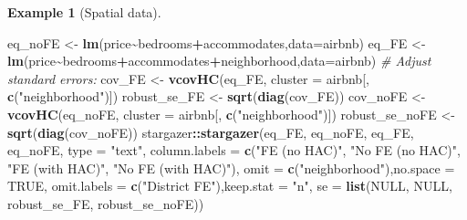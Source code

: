 \documentclass[
  12pt,
]{book}
\newenvironment{Shaded}{\begin{snugshade}}{\end{snugshade}}
\newcommand{\AttributeTok}[1]{\textcolor[rgb]{0.13,0.29,0.53}{#1}}
\newcommand{\CommentTok}[1]{\textcolor[rgb]{0.56,0.35,0.01}{\textit{#1}}}
\newcommand{\ConstantTok}[1]{\textcolor[rgb]{0.56,0.35,0.01}{#1}}
\newcommand{\FunctionTok}[1]{\textcolor[rgb]{0.13,0.29,0.53}{\textbf{#1}}}
\newcommand{\NormalTok}[1]{#1}
\newcommand{\OtherTok}[1]{\textcolor[rgb]{0.56,0.35,0.01}{#1}}
\newcommand{\SpecialCharTok}[1]{\textcolor[rgb]{0.81,0.36,0.00}{\textbf{#1}}}
\newcommand{\StringTok}[1]{\textcolor[rgb]{0.31,0.60,0.02}{#1}}
\theoremstyle{definition}
\theoremstyle{definition}
\newtheorem{example}{Example}[chapter]
\theoremstyle{definition}
\theoremstyle{definition}
\theoremstyle{remark}
\begin{document}
\begin{example}[Spatial data]
\begin{Shaded}
\begin{Highlighting}[]
\NormalTok{eq\_noFE }\OtherTok{\textless{}{-}} \FunctionTok{lm}\NormalTok{(price}\SpecialCharTok{\textasciitilde{}}\NormalTok{bedrooms}\SpecialCharTok{+}\NormalTok{accommodates,}\AttributeTok{data=}\NormalTok{airbnb)}
\NormalTok{eq\_FE   }\OtherTok{\textless{}{-}} \FunctionTok{lm}\NormalTok{(price}\SpecialCharTok{\textasciitilde{}}\NormalTok{bedrooms}\SpecialCharTok{+}\NormalTok{accommodates}\SpecialCharTok{+}\NormalTok{neighborhood,}\AttributeTok{data=}\NormalTok{airbnb)}
\CommentTok{\# Adjust standard errors:}
\NormalTok{cov\_FE          }\OtherTok{\textless{}{-}} \FunctionTok{vcovHC}\NormalTok{(eq\_FE, }\AttributeTok{cluster =}\NormalTok{ airbnb[, }\FunctionTok{c}\NormalTok{(}\StringTok{"neighborhood"}\NormalTok{)])}
\NormalTok{robust\_se\_FE    }\OtherTok{\textless{}{-}} \FunctionTok{sqrt}\NormalTok{(}\FunctionTok{diag}\NormalTok{(cov\_FE))}
\NormalTok{cov\_noFE        }\OtherTok{\textless{}{-}} \FunctionTok{vcovHC}\NormalTok{(eq\_noFE, }\AttributeTok{cluster =}\NormalTok{ airbnb[, }\FunctionTok{c}\NormalTok{(}\StringTok{"neighborhood"}\NormalTok{)])}
\NormalTok{robust\_se\_noFE  }\OtherTok{\textless{}{-}} \FunctionTok{sqrt}\NormalTok{(}\FunctionTok{diag}\NormalTok{(cov\_noFE))}
\NormalTok{stargazer}\SpecialCharTok{::}\FunctionTok{stargazer}\NormalTok{(eq\_FE, eq\_noFE, eq\_FE, eq\_noFE, }\AttributeTok{type =} \StringTok{"text"}\NormalTok{,}
                     \AttributeTok{column.labels =} \FunctionTok{c}\NormalTok{(}\StringTok{"FE (no HAC)"}\NormalTok{, }\StringTok{"No FE (no HAC)"}\NormalTok{,}
                                       \StringTok{"FE (with HAC)"}\NormalTok{, }\StringTok{"No FE (with HAC)"}\NormalTok{),}
                     \AttributeTok{omit =} \FunctionTok{c}\NormalTok{(}\StringTok{"neighborhood"}\NormalTok{),}\AttributeTok{no.space =} \ConstantTok{TRUE}\NormalTok{,}
                     \AttributeTok{omit.labels =} \FunctionTok{c}\NormalTok{(}\StringTok{"District FE"}\NormalTok{),}\AttributeTok{keep.stat =} \StringTok{"n"}\NormalTok{,}
                     \AttributeTok{se =} \FunctionTok{list}\NormalTok{(}\ConstantTok{NULL}\NormalTok{, }\ConstantTok{NULL}\NormalTok{, robust\_se\_FE, robust\_se\_noFE))}
\end{Highlighting}
\end{Shaded}


\end{example}
\end{document}

